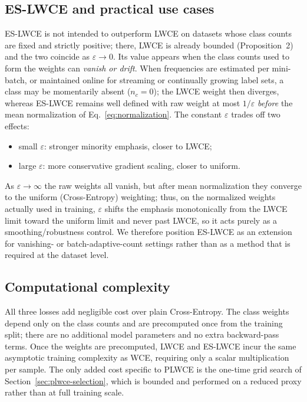 \documentclass[a4paper,fleqn]{cas-sc}
\begin{document}
\subsection{ES-LWCE and practical use cases}\label{sec:eslwce-use}
ES-LWCE is not intended to outperform LWCE on datasets whose class counts are
fixed and strictly positive; there, LWCE is already bounded (Proposition~2) and
the two coincide as $\varepsilon \to 0$. Its value appears when the class counts
used to form the weights can \emph{vanish or drift}. When frequencies are
estimated per mini-batch, or maintained online for streaming or continually
growing label sets, a class may be momentarily absent ($n_c = 0$); the LWCE weight
then diverges, whereas ES-LWCE remains well defined with raw weight at most
$1/\varepsilon$ \emph{before} the mean normalization of
Eq.~\eqref{eq:normalization}. The constant $\varepsilon$ trades off two effects:
\begin{itemize}
\item small $\varepsilon$: stronger minority emphasis, closer to LWCE;
\item large $\varepsilon$: more conservative gradient scaling, closer to uniform.
\end{itemize}
As $\varepsilon \to \infty$ the raw weights all vanish, but after mean
normalization they converge to the uniform (Cross-Entropy) weighting; thus, on the
normalized weights actually used in training, $\varepsilon$ shifts the emphasis
monotonically from the LWCE limit toward the uniform limit and never past LWCE, so
it acts purely as a smoothing/robustness control. We therefore position ES-LWCE as an extension for
vanishing- or batch-adaptive-count settings rather than as a method that is
required at the dataset level.

\subsection{Computational complexity}\label{sec:complexity}
All three losses add negligible cost over plain Cross-Entropy. The class weights
depend only on the class counts and are precomputed once from the training split;
there are no additional model parameters and no extra backward-pass terms. Once
the weights are precomputed, LWCE and ES-LWCE incur the same asymptotic training
complexity as WCE, requiring only a scalar multiplication per sample. The only
added cost specific to PLWCE is the one-time grid search of
Section~\ref{sec:plwce-selection}, which is bounded and performed on a reduced
proxy rather than at full training scale.
\end{document}
